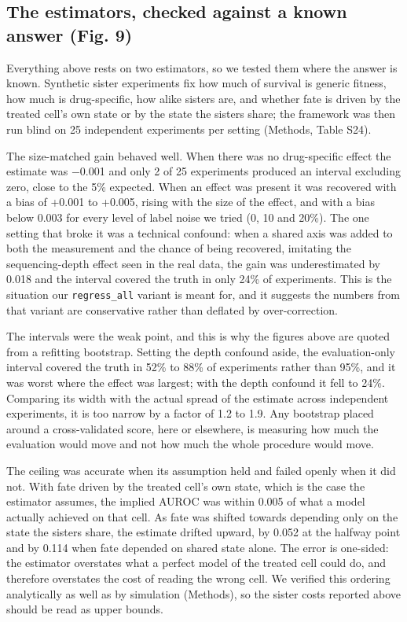 \documentclass[11pt,a4paper]{article}
\begin{document}
\subsection*{The estimators, checked against a known answer (Fig. 9)}

Everything above rests on two estimators, so we tested them where the answer is known. Synthetic sister experiments fix how much of survival is generic fitness, how much is drug-specific, how alike sisters are, and whether fate is driven by the treated cell's own state or by the state the sisters share; the framework was then run blind on 25 independent experiments per setting (Methods, Table S24).

The size-matched gain behaved well. When there was no drug-specific effect the estimate was $-$0.001 and only 2 of 25 experiments produced an interval excluding zero, close to the 5\% expected. When an effect was present it was recovered with a bias of +0.001 to +0.005, rising with the size of the effect, and with a bias below 0.003 for every level of label noise we tried (0, 10 and 20\%). The one setting that broke it was a technical confound: when a shared axis was added to both the measurement and the chance of being recovered, imitating the sequencing-depth effect seen in the real data, the gain was underestimated by 0.018 and the interval covered the truth in only 24\% of experiments. This is the situation our \texttt{regress\_all} variant is meant for, and it suggests the numbers from that variant are conservative rather than deflated by over-correction.

The intervals were the weak point, and this is why the figures above are quoted from a refitting bootstrap. Setting the depth confound aside, the evaluation-only interval covered the truth in 52\% to 88\% of experiments rather than 95\%, and it was worst where the effect was largest; with the depth confound it fell to 24\%. Comparing its width with the actual spread of the estimate across independent experiments, it is too narrow by a factor of 1.2 to 1.9. Any bootstrap placed around a cross-validated score, here or elsewhere, is measuring how much the evaluation would move and not how much the whole procedure would move.

The ceiling was accurate when its assumption held and failed openly when it did not. With fate driven by the treated cell's own state, which is the case the estimator assumes, the implied AUROC was within 0.005 of what a model actually achieved on that cell. As fate was shifted towards depending only on the state the sisters share, the estimate drifted upward, by 0.052 at the halfway point and by 0.114 when fate depended on shared state alone. The error is one-sided: the estimator overstates what a perfect model of the treated cell could do, and therefore overstates the cost of reading the wrong cell. We verified this ordering analytically as well as by simulation (Methods), so the sister costs reported above should be read as upper bounds.
\end{document}
